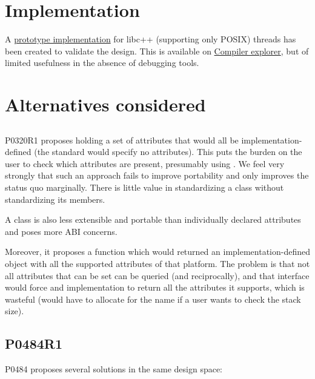 \documentclass{wg21}
\begin{document}
\section{Implementation}

A \href{https://github.com/cor3ntin/llvm-project/tree/corentin/thread_name_p2019}{prototype implementation} for libc++ (supporting only POSIX) threads has been created to validate the design.
This is available on \href{https://compiler-explorer.com/z/MzGsndc7W}{Compiler explorer}, but of limited usefulness in the absence of debugging tools.

\section{Alternatives considered}

\subsection{}

P0320R1 proposes  holding a set of attributes that would all be implementation-defined (the standard would specify no attributes).
This puts the burden on the user to check which attributes are present, presumably using .
We feel very strongly that such an approach fails to improve portability and only improves the status quo marginally.
There is little value in standardizing a class without standardizing its members.

A class is also less extensible and portable than individually declared attributes and poses more ABI concerns.

Moreover, it proposes a  function which would returned an implementation-defined object
with all the supported attributes of that platform.
The problem is that not all attributes that can be set can be queried (and reciprocally), and that interface would force
and implementation to return all the attributes it supports, which is wasteful (would have to allocate for the name if a user wants to check the stack size).

\subsection{P0484R1}

P0484 proposes several solutions in the same design space:
\end{document}
